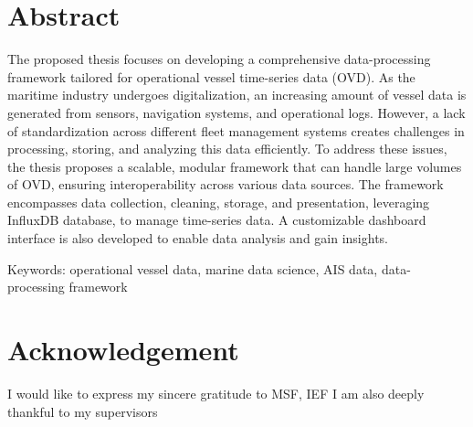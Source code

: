 \chapter*{Abstract}\label{chap:abstract}





The proposed thesis focuses on developing a comprehensive data-processing framework tailored for operational vessel time-series data (OVD). As the maritime industry undergoes digitalization, an increasing amount of vessel data is generated from sensors, navigation systems, and operational logs. However, a lack of standardization across different fleet management systems creates challenges in processing, storing, and analyzing this data efficiently. To address these issues, the thesis proposes a scalable, modular framework that can handle large volumes of OVD, ensuring interoperability across various data sources. The framework encompasses data collection, cleaning, storage, and presentation, leveraging InfluxDB database, to manage time-series data. A customizable dashboard interface is also developed to enable data analysis and gain insights. 


Keywords: operational vessel data, marine data science, AIS data, data-processing framework







\newpage
\chapter*{Acknowledgement}\label{chap:ack}
I would like to express my sincere gratitude to MSF, IEF
I am also deeply thankful to my supervisors